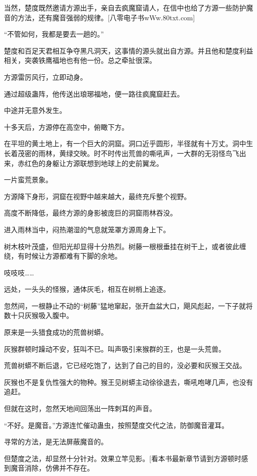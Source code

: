 
\begin{this_body}

当然，楚度既然邀请方源出手，亲自去疯魔窟请人，在信中也给了方源一些防护魔音的方法，还有魔音强弱的规律。[八零电子书wWw.80txt.com]

“不管如何，我都是要去一趟的。”

楚度和百足天君相互争夺黑凡洞天，这事情的源头就出自方源。并且他和楚度利益相关，突袭铁鹰福地也有他一份。总之牵扯很深。

方源雷厉风行，立即动身。

通过超级蛊阵，他传送出琅琊福地，便一路往疯魔窟赶去。

中途并无意外发生。

十多天后，方源停在高空中，俯瞰下方。

在平坦的黄土地上，有一个巨大的洞窟。洞口近乎圆形，半径就有十万丈。洞中生长着茂密的雨林，黄绿交映。时不时传出荒兽的嘶吼声，一大群的无羽怪鸟飞出来，赤红色的身躯让方源联想到地球上的史前翼龙。

一片蛮荒景象。

方源降下身形，洞窟在视野中越来越大，最终充斥整个视野。

高度不断降低，最终方源的身影被庞巨的洞窟雨林吞没。

进入雨林当中，闷热潮湿的气息就笼罩方源周身上下。

树木枝叶茂盛，但阳光却显得十分热烈。树藤一根根垂挂在树干上，或者彼此缠绕，有时候让方源都难有下脚的余地。

吱吱吱……

远处，一头头的怪猴，通体灰毛，相互在树梢上追逐。

忽然间，一根静止不动的“树藤”猛地窜起，张开血盆大口，飓风彪起，一下子就将数十只灰猴吸入腹中。

原来是一头猎食成功的荒兽树蟒。

灰猴群顿时躁动不安，狂叫不已。叫声吸引来猴群的王，也是一头荒兽。

荒兽树蟒不断后退，它已经吃饱了，达到了自己的目的，没必要和灰猴王交战。

灰猴也不是复仇性强大的物种。猴王见树蟒主动徐徐退去，嘶吼咆哮几声，也没有追赶。

但就在这时，忽然天地间回荡出一阵刺耳的声音。

“不好。是魔音。”方源连忙催动蛊虫，按照楚度交代之法，防御魔音灌耳。

寻常的方法，是无法屏蔽魔音的。

但楚度之法，却显然十分针对。效果立竿见影。[看本书最新章节请到方源顿时感到魔音消除，仿佛并不存在。


\end{this_body}
